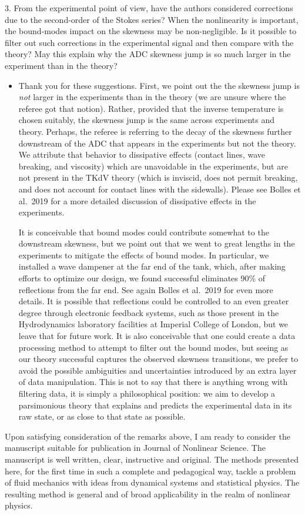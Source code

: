 \documentclass[11pt]{article}
\newcommand{\comment}[1]{{\color{blue} #1}}
\begin{document}
\noindent
\comment{
3. From the experimental point of view, have the authors considered corrections due to the second-order of the Stokes series? When the nonlinearity is important, the bound-modes impact on the skewness may be non-negligible. Is it possible to filter out such corrections in the experimental signal and then compare with the theory? May this explain why the ADC skewness jump is so much larger in the experiment than in the theory?
}
\begin{itemize}
\item Thank you for these suggestions. First, we point out the the skewness jump is {\em not} larger in the experiments than in the theory (we are unsure where the referee got that notion). Rather, provided that the inverse temperature is chosen suitably, the skewness jump is the same across experiments and theory. Perhaps, the referee is referring to the decay of the skewness further downstream of the ADC that appears in the experiments but not the theory. We attribute that behavior to dissipative effects (contact lines, wave breaking, and viscosity) which are unavoidable in the experiments, but are not present in the TKdV theory (which is inviscid, does not permit breaking, and does not account for contact lines with the sidewalls). Please see Bolles et al.~2019 for a more detailed discussion of dissipative effects in the experiments.

It is conceivable that bound modes could contribute somewhat to the downstream skewness, but we point out that we went to great lengths in the experiments to mitigate the effects of bound modes. In particular, we installed a wave dampener at the far end of the tank, which, after making efforts to optimize our design, we found successful eliminates 90\% of reflections from the far end. See again Bolles et al.~2019 for even more details. It is possible that reflections could be controlled to an even greater degree through electronic feedback systems, such as those present in the Hydrodynamics laboratory facilities at Imperial College of London, but we leave that for future work. It is also conceivable that one could create a data processing method to attempt to filter out the bound modes, but seeing as our theory successful captures the observed skewness transitions, we prefer to avoid the possible ambiguities and uncertainties introduced by an extra layer of data manipulation. 
This is not to say that there is anything wrong with filtering data, it is simply a philosophical position: we aim to develop a parsimonious theory that explains and predicts the experimental data in its raw state, or as close to that state as possible.
\end{itemize}

\noindent
\comment{
Upon satisfying consideration of the remarks above, I am ready to consider the manuscript suitable for publication in Journal of Nonlinear Science. The manuscript is well written, clear, instructive and original. The methods presented here, for the first time in such a complete and pedagogical way, tackle a problem of fluid mechanics with ideas from dynamical systems and statistical physics. The resulting method is general and of broad applicability in the realm of nonlinear physics.
}
\end{document}

